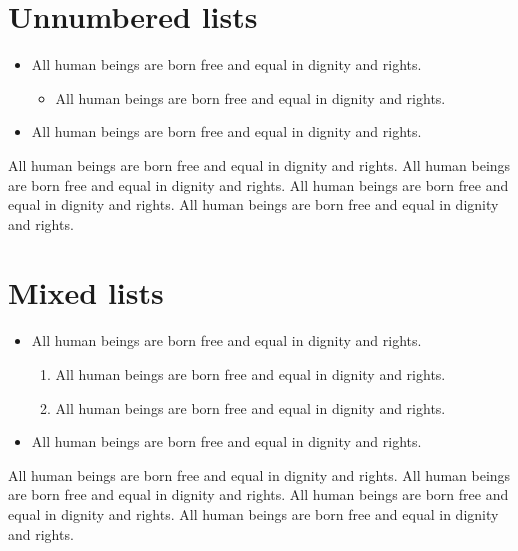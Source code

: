 \documentclass[
  titlepage,
  openright,
  DIV=calc,
  toc=listof,
  listof=nochaptergap]{scrbook}
\providecommand{\tightlist}{%
  \setlength{\itemsep}{0pt}\setlength{\parskip}{0pt}}
\begin{document}
\hypertarget{unnumbered-lists}{%
\section{Unnumbered lists}\label{unnumbered-lists}}

\begin{itemize}
\tightlist
\item
  All human beings are born free and equal in dignity and rights.

  \begin{itemize}
  \tightlist
  \item
    All human beings are born free and equal in dignity and rights.
  \end{itemize}
\item
  All human beings are born free and equal in dignity and rights.
\end{itemize}

All human beings are born free and equal in dignity and rights. All
human beings are born free and equal in dignity and rights. All human
beings are born free and equal in dignity and rights. All human beings
are born free and equal in dignity and rights.

\hypertarget{mixed-lists}{%
\section{Mixed lists}\label{mixed-lists}}

\begin{itemize}
\tightlist
\item
  All human beings are born free and equal in dignity and rights.

  \begin{enumerate}
  \def\labelenumi{\arabic{enumi}.}
  \tightlist
  \item
    All human beings are born free and equal in dignity and rights.
  \item
    All human beings are born free and equal in dignity and rights.
  \end{enumerate}
\item
  All human beings are born free and equal in dignity and rights.
\end{itemize}

All human beings are born free and equal in dignity and rights. All
human beings are born free and equal in dignity and rights. All human
beings are born free and equal in dignity and rights. All human beings
are born free and equal in dignity and rights.
\end{document}
